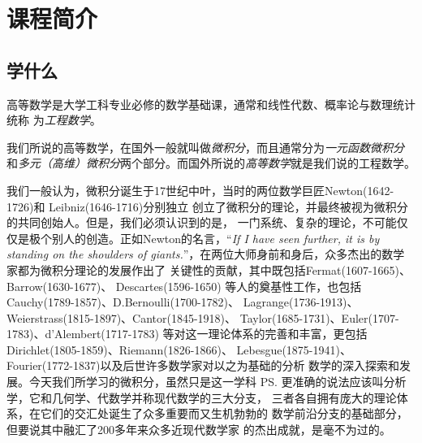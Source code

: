 \section{课程简介}

\subsection{学什么}

高等数学是大学工科专业必修的数学基础课，通常和线性代数、概率论与数理统计统称
为{\it 工程数学}。

我们所说的高等数学，在国外一般就叫做{\it 微积分}，而且通常分为{\it 一元函数微积分}
和{\it 多元（高维）微积分}两个部分。而国外所说的{\it 高等数学}就是我们说的工程数学。

我们一般认为，微积分诞生于17世纪中叶，当时的两位数学巨匠Newton(1642-1726)和
Leibniz(1646-1716)分别独立
创立了微积分的理论，并最终被视为微积分的共同创始人。但是，我们必须认识到的是，
一门系统、复杂的理论，不可能仅仅是极个别人的创造。正如Newton的名言，“{\it If 
I have seen further, it is by standing on the shoulders of
giants.}”，在两位大师身前和身后，众多杰出的数学家都为微积分理论的发展作出了
关键性的贡献，其中既包括Fermat(1607-1665)、Barrow(1630-1677)、
Descartes(1596-1650)%
等人的奠基性工作，也包括Cauchy(1789-1857)、D.Bernoulli(1700-1782)、
Lagrange(1736-1913)、Weierstrass(1815-1897)、Cantor(1845-1918)、
Taylor(1685-1731)、Euler(1707-1783)、d'Alembert(1717-1783)
等对这一理论体系的完善和丰富，更包括Dirichlet(1805-1859)、Riemann(1826-1866)、
Lebesgue(1875-1941)、Fourier(1772-1837)以及后世许多数学家对以之为基础的分析
数学的深入探索和发展。今天我们所学习的微积分，虽然只是这一学科
\ps{更准确的说法应该叫分析学，它和几何学、代数学并称现代数学的三大分支，
三者各自拥有庞大的理论体系，在它们的交汇处诞生了众多重要而又生机勃勃的
数学前沿分支}的基础部分，但要说其中融汇了200多年来众多近现代数学家
的杰出成就，是毫不为过的。



